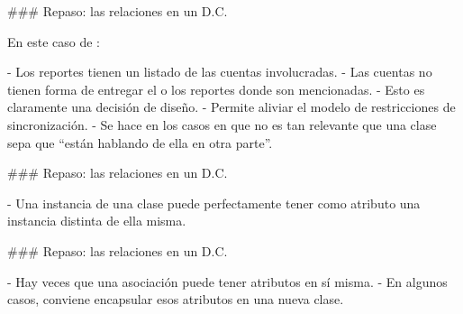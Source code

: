 ### Repaso: las relaciones en un D.C.


En este caso de :

\begin{center}
\end{center}

- Los reportes tienen un listado de las cuentas involucradas.
- Las cuentas no tienen forma de entregar el o los reportes donde son mencionadas.
    - Esto es claramente una decisión de diseño.
    - Permite aliviar el modelo de restricciones de sincronización.
        - Se hace en los casos en que no es tan relevante que una clase sepa que ``están
        hablando de ella en otra parte''.

### Repaso: las relaciones en un D.C.


- Una instancia de una clase puede perfectamente tener como atributo una instancia distinta de ella misma.

\begin{center}
\end{center}

### Repaso: las relaciones en un D.C.


- Hay veces que una asociación puede tener atributos en sí misma.
- En algunos casos, conviene encapsular esos atributos en una nueva clase.


